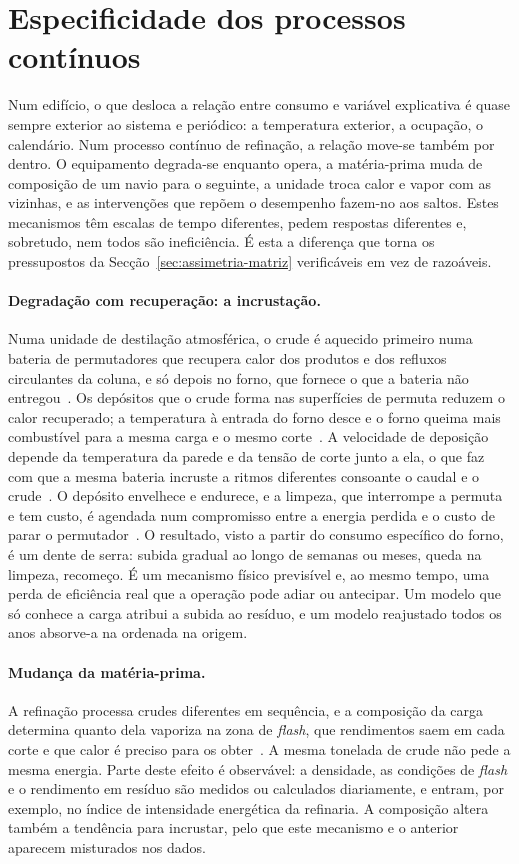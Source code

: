 \section{Especificidade dos processos contínuos}
\label{sec:processos-continuos}

Num edifício, o que desloca a relação entre consumo e variável explicativa
é quase sempre exterior ao sistema e periódico: a temperatura exterior, a
ocupação, o calendário. Num processo contínuo de refinação, a relação move-se
também por dentro. O equipamento degrada-se enquanto opera, a matéria-prima
muda de composição de um navio para o seguinte, a unidade troca calor e
vapor com as vizinhas, e as intervenções que repõem o desempenho fazem-no aos
saltos. Estes mecanismos têm escalas de tempo diferentes, pedem respostas
diferentes e, sobretudo, nem todos são ineficiência. É esta a diferença que
torna os pressupostos da Secção~\ref{sec:assimetria-matriz} verificáveis em
vez de razoáveis.

\paragraph{Degradação com recuperação: a incrustação.} Numa unidade de
destilação atmosférica, o crude é aquecido primeiro numa bateria de
permutadores que recupera calor dos produtos e dos refluxos circulantes da
coluna, e só depois no forno, que fornece o que a bateria não entregou~\cite{Gary2007}.
Os depósitos que o crude forma nas superfícies de permuta reduzem o calor
recuperado; a temperatura à entrada do forno desce e o forno queima mais
combustível para a mesma carga e o mesmo corte~\cite{ColettiMacchietto2011}.
A velocidade de deposição depende da temperatura da parede e da tensão de
corte junto a ela, o que faz com que a mesma bateria incruste a ritmos
diferentes consoante o caudal e o crude~\cite{Wilson2017}. O depósito envelhece e
endurece, e a limpeza, que interrompe a permuta e tem custo, é agendada num
compromisso entre a energia perdida e o custo de parar o
permutador~\cite{Ishiyama2011}. O resultado, visto a partir do consumo
específico do forno, é um dente de serra: subida gradual ao longo de semanas
ou meses, queda na limpeza, recomeço. É um mecanismo físico previsível e, ao
mesmo tempo, uma perda de eficiência real que a operação pode adiar ou
antecipar. Um modelo que só conhece a carga atribui a subida ao resíduo, e um
modelo reajustado todos os anos absorve-a na ordenada na origem.

\paragraph{Mudança da matéria-prima.} A refinação processa crudes diferentes
em sequência, e a composição da carga determina quanto dela vaporiza na zona
de \emph{flash}, que rendimentos saem em cada corte e que calor é preciso
para os obter~\cite{Gary2007}. A mesma tonelada de crude não pede a mesma
energia. Parte deste efeito é observável: a densidade, as condições de
\emph{flash} e o rendimento em resíduo são medidos ou calculados
diariamente, e entram, por exemplo, no índice de intensidade energética da
refinaria. A composição altera também a tendência para incrustar, pelo que
este mecanismo e o anterior aparecem misturados nos dados.


